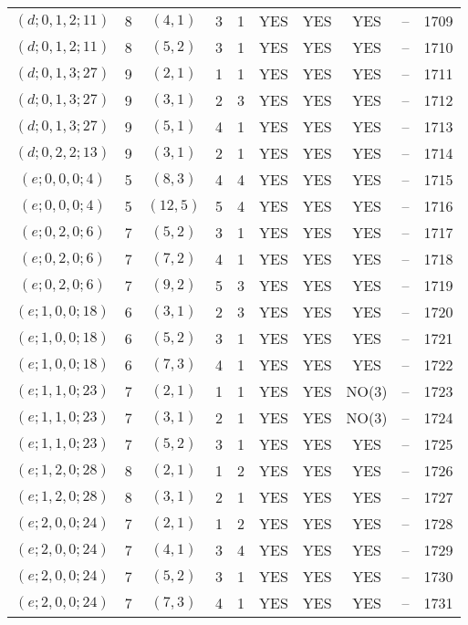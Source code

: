 \begin{longtable}{|c|c|c|c|c|c|c|c|c|c|}
$(d; 0, 1, 2; 11)$ & 8 & $(4, 1)$ & 3 & 1 & YES & YES & YES & -- & 1709\\
$(d; 0, 1, 2; 11)$ & 8 & $(5, 2)$ & 3 & 1 & YES & YES & YES & -- & 1710\\
$(d; 0, 1, 3; 27)$ & 9 & $(2, 1)$ & 1 & 1 & YES & YES & YES & -- & 1711\\
$(d; 0, 1, 3; 27)$ & 9 & $(3, 1)$ & 2 & 3 & YES & YES & YES & -- & 1712\\
$(d; 0, 1, 3; 27)$ & 9 & $(5, 1)$ & 4 & 1 & YES & YES & YES & -- & 1713\\
$(d; 0, 2, 2; 13)$ & 9 & $(3, 1)$ & 2 & 1 & YES & YES & YES & -- & 1714\\
$(e; 0, 0, 0; 4)$ & 5 & $(8, 3)$ & 4 & 4 & YES & YES & YES & -- & 1715\\
$(e; 0, 0, 0; 4)$ & 5 & $(12, 5)$ & 5 & 4 & YES & YES & YES & -- & 1716\\
$(e; 0, 2, 0; 6)$ & 7 & $(5, 2)$ & 3 & 1 & YES & YES & YES & -- & 1717\\
$(e; 0, 2, 0; 6)$ & 7 & $(7, 2)$ & 4 & 1 & YES & YES & YES & -- & 1718\\
$(e; 0, 2, 0; 6)$ & 7 & $(9, 2)$ & 5 & 3 & YES & YES & YES & -- & 1719\\
$(e; 1, 0, 0; 18)$ & 6 & $(3, 1)$ & 2 & 3 & YES & YES & YES & -- & 1720\\
$(e; 1, 0, 0; 18)$ & 6 & $(5, 2)$ & 3 & 1 & YES & YES & YES & -- & 1721\\
$(e; 1, 0, 0; 18)$ & 6 & $(7, 3)$ & 4 & 1 & YES & YES & YES & -- & 1722\\
$(e; 1, 1, 0; 23)$ & 7 & $(2, 1)$ & 1 & 1 & YES & YES & NO(3) & -- & 1723\\
$(e; 1, 1, 0; 23)$ & 7 & $(3, 1)$ & 2 & 1 & YES & YES & NO(3) & -- & 1724\\
$(e; 1, 1, 0; 23)$ & 7 & $(5, 2)$ & 3 & 1 & YES & YES & YES & -- & 1725\\
$(e; 1, 2, 0; 28)$ & 8 & $(2, 1)$ & 1 & 2 & YES & YES & YES & -- & 1726\\
$(e; 1, 2, 0; 28)$ & 8 & $(3, 1)$ & 2 & 1 & YES & YES & YES & -- & 1727\\
$(e; 2, 0, 0; 24)$ & 7 & $(2, 1)$ & 1 & 2 & YES & YES & YES & -- & 1728\\
$(e; 2, 0, 0; 24)$ & 7 & $(4, 1)$ & 3 & 4 & YES & YES & YES & -- & 1729\\
$(e; 2, 0, 0; 24)$ & 7 & $(5, 2)$ & 3 & 1 & YES & YES & YES & -- & 1730\\
$(e; 2, 0, 0; 24)$ & 7 & $(7, 3)$ & 4 & 1 & YES & YES & YES & -- & 1731\\

\end{longtable}
